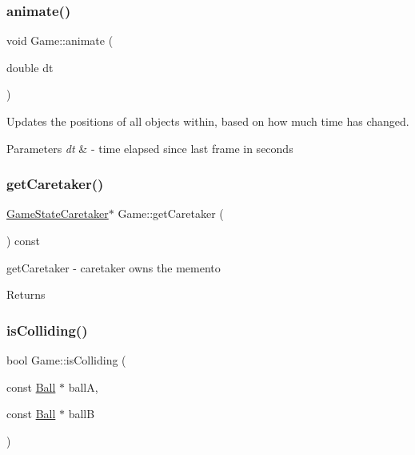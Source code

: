 \subsubsection{\texorpdfstring{animate()}{animate()}}
{\footnotesize\ttfamily void Game\+::animate (\begin{DoxyParamCaption}\item[{double}]{dt }\end{DoxyParamCaption})}



Updates the positions of all objects within, based on how much time has changed. 


\begin{DoxyParams}{Parameters}
{\em dt} & -\/ time elapsed since last frame in seconds \\
\hline
\end{DoxyParams}
\mbox{\label{class_game_afb5186bfcaa6420721cd50a9d685482b}} 
\subsubsection{\texorpdfstring{get\+Caretaker()}{getCaretaker()}}
{\footnotesize\ttfamily \mbox{\hyperlink{class_game_state_caretaker}{Game\+State\+Caretaker}}$\ast$ Game\+::get\+Caretaker (\begin{DoxyParamCaption}{ }\end{DoxyParamCaption}) const\hspace{0.3cm}{\ttfamily [inline]}}



get\+Caretaker -\/ caretaker owns the memento 

\begin{DoxyReturn}{Returns}

\end{DoxyReturn}
\mbox{\label{class_game_ac574803a4cd9cb5f52f72268c5f22b40}} 
\subsubsection{\texorpdfstring{is\+Colliding()}{isColliding()}}
{\footnotesize\ttfamily bool Game\+::is\+Colliding (\begin{DoxyParamCaption}\item[{const \mbox{\hyperlink{class_ball}{Ball}} $\ast$}]{ballA,  }\item[{const \mbox{\hyperlink{class_ball}{Ball}} $\ast$}]{ballB }\end{DoxyParamCaption})\hspace{0.3cm}{\ttfamily [inline]}}



